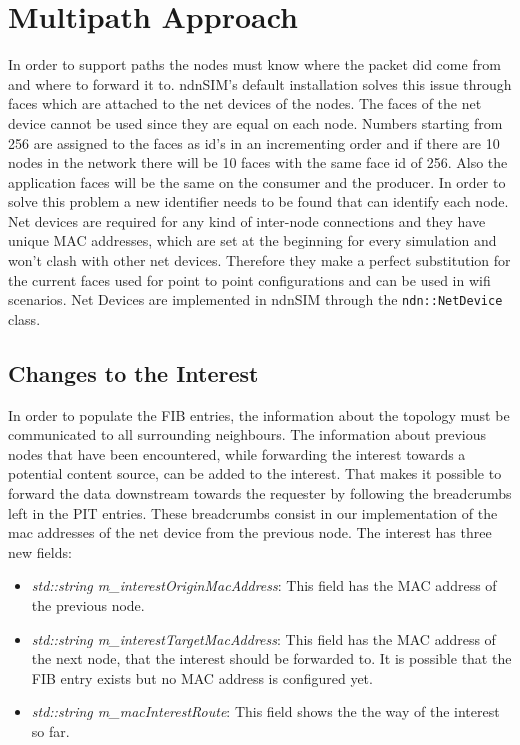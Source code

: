 \section{Multipath Approach}

In order to support paths the nodes must know where the packet did come from and where to forward it to. ndnSIM's default installation solves this issue through faces which are attached to the net devices of the nodes. The faces of the net device cannot be used since they are equal on each node. Numbers starting from 256 are assigned to the faces as id's in an incrementing order and if there are 10 nodes in the network there will be 10 faces with the same face id of 256. Also the application faces will be the same on the consumer and the producer. In order to solve this problem a new identifier needs to be found that can identify each node. Net devices are required for any kind of inter-node connections and they have unique MAC addresses, which are set at the beginning for every simulation and won't clash with other net devices. Therefore they make a perfect substitution for the current faces used for point to point configurations and can be used in wifi scenarios. Net Devices are implemented in ndnSIM through the \texttt{ndn::NetDevice} class.

\subsection{Changes to the Interest}

In order to populate the FIB entries, the information about the topology must be communicated to all surrounding neighbours. The information about previous nodes that have been encountered, while forwarding the interest towards a potential content source, can be added to the interest. That makes it possible to forward the data downstream towards the requester by following the breadcrumbs left in the PIT entries. These breadcrumbs consist in our implementation of the mac addresses of the net device from the previous node. The interest has three new fields:

\begin{itemize}
\item \emph{std::string m\_interestOriginMacAddress}: This field has the MAC address of the previous node.
\item \emph{std::string m\_interestTargetMacAddress}: This field has the MAC address of the next node, that the interest should be forwarded to. It is possible that the FIB entry exists but no MAC address is configured yet.
\item \emph{std::string m\_macInterestRoute}: This field shows the the way of the interest so far.
\end{itemize}

